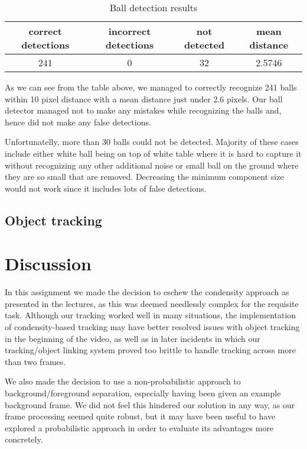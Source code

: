 \documentclass[12pt,a4paper]{article}
\begin{document}
\begin{table}[h]
\centering
\begin{tabular}{@{}cccc@{}}
\toprule
correct detections & incorrect detections & not detected & mean distance \\ \midrule
241                & 0                    & 32           & 2.5746        \\ \bottomrule
\end{tabular}
\caption{Ball detection results}
\label{my-label}
\end{table}

As we can see from the table above, we managed to correctly recognize 241 balls within 10 pixel distance with a mean distance just under 2.6 pixels. Our ball detector managed not to make any mistakes while recognizing the balls and, hence did not make any false detections.

Unfortunatelly, more than 30 balls could not be detected. Majority of these cases include either white ball being on top of white table where it is hard to capture it without recognizing any other additional noise or small ball on the ground where they are so small that are removed. Decreasing the minimum component size would not work since it includes lots of false detections. 

\subsection{Object tracking}


\section{Discussion}
In this assignment we made the decision to eschew the condensity approach as presented in the lectures, as this was deemed needlessly complex for the requisite task. Although our tracking worked well in many situations, the implementation of condensity-based tracking may have better resolved issues with object tracking in the beginning of the video, as well as in later incidents in which our tracking/object linking system proved too brittle to handle tracking across more than two frames.

We also made the decision to use a non-probabilistic approach to background/foreground separation, especially having been given an example background frame. We did not feel this hindered our solution in any way, as our frame processing seemed quite robust, but it may have been useful to have explored a probabilistic approach in order to evaluate its advantages more concretely. 
\end{document}
